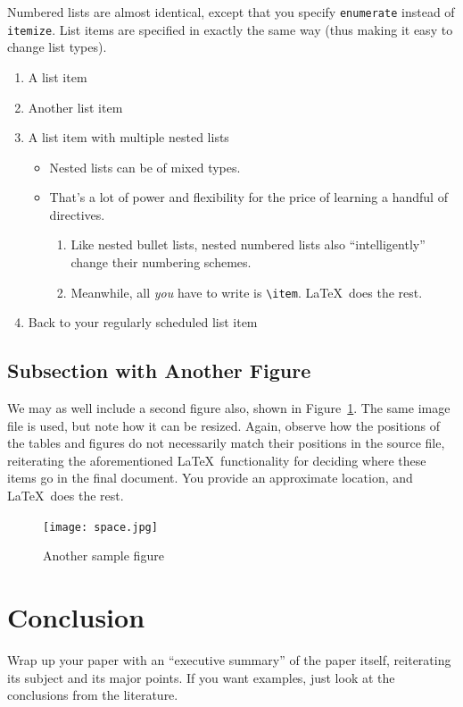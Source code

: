 \documentclass{article}
\begin{document}
Numbered lists are almost identical, except that you specify \verb!enumerate! instead of \verb!itemize!.  List items are specified in exactly the same way (thus making it easy to change list types).

\begin{enumerate}
\item A list item
\item Another list item
\item A list item with multiple nested lists

\begin{itemize}
\item Nested lists can be of mixed types.
\item That's a lot of power and flexibility for the price of learning a handful of directives.

\begin{enumerate}
\item Like nested bullet lists, nested numbered lists also ``intelligently'' change their numbering schemes.
\item Meanwhile, all \emph{you} have to write is \verb!\item!.  \LaTeX\ does the rest.
\end{enumerate}
\end{itemize}

\item Back to your regularly scheduled list item

\end{enumerate}

\subsection{Subsection with Another Figure}

We may as well include a second figure also, shown in Figure~\ref{figure-sample2}.  The same image file is used, but note how it can be resized.  Again, observe how the positions of the tables and figures do not necessarily match their positions in the source file, reiterating the aforementioned \LaTeX\ functionality for deciding where these items go in the final document.  You provide an approximate location, and \LaTeX\ does the rest.

\begin{figure}
\centering
\texttt{[image: space.jpg]} 

\caption{Another sample figure}
\label{figure-sample2}
\end{figure}

\section{Conclusion}

Wrap up your paper with an ``executive summary'' of the paper itself, reiterating its subject and its major points.  If you want examples, just look at the conclusions from the literature.



\end{document}
